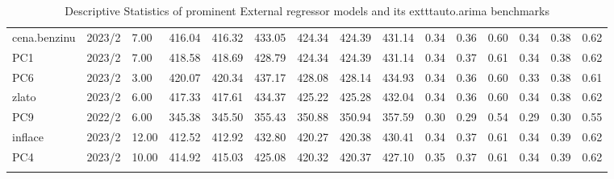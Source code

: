 \begin{longtable}{p{1.5cm}p{1.0cm}p{1.5cm}p{1.0cm}p{1.0cm}p{1.0cm}p{1.0cm}p{1.0cm}p{1.0cm}p{1.0cm}p{1.0cm}p{1.0cm}p{1.0cm}p{1.0cm}p{1.0cm}}
  cena.benzinu & 2023/2 & 7.00 & 416.04 & 416.32 & 433.05 & 424.34 & 424.39 & 431.14 & 0.34 & 0.36 & 0.60 & 0.34 & 0.38 & 0.62 \\ 
  PC1 & 2023/2 & 7.00 & 418.58 & 418.69 & 428.79 & 424.34 & 424.39 & 431.14 & 0.34 & 0.37 & 0.61 & 0.34 & 0.38 & 0.62 \\ 
  PC6 & 2023/2 & 3.00 & 420.07 & 420.34 & 437.17 & 428.08 & 428.14 & 434.93 & 0.34 & 0.36 & 0.60 & 0.33 & 0.38 & 0.61 \\ 
  zlato & 2023/2 & 6.00 & 417.33 & 417.61 & 434.37 & 425.22 & 425.28 & 432.04 & 0.34 & 0.36 & 0.60 & 0.34 & 0.38 & 0.62 \\ 
  PC9 & 2022/2 & 6.00 & 345.38 & 345.50 & 355.43 & 350.88 & 350.94 & 357.59 & 0.30 & 0.29 & 0.54 & 0.29 & 0.30 & 0.55 \\ 
  inflace & 2023/2 & 12.00 & 412.52 & 412.92 & 432.80 & 420.27 & 420.38 & 430.41 & 0.34 & 0.37 & 0.61 & 0.34 & 0.39 & 0.62 \\ 
  PC4 & 2023/2 & 10.00 & 414.92 & 415.03 & 425.08 & 420.32 & 420.37 & 427.10 & 0.35 & 0.37 & 0.61 & 0.34 & 0.39 & 0.62 \\ 
   \hline
\hline
\caption{Descriptive Statistics of prominent External regressor models and its 	exttt{auto.arima} benchmarks} 
\label{tab:aa_result}
\end{longtable}
